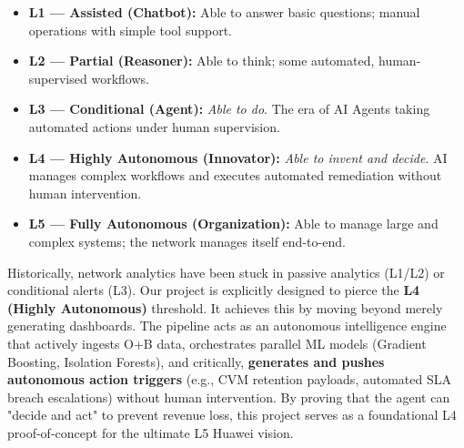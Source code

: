 \begin{itemize}
  \item \textbf{L1 --- Assisted (Chatbot):} Able to answer basic questions; manual operations with simple tool support.
  \item \textbf{L2 --- Partial (Reasoner):} Able to think; some automated, human-supervised workflows.
  \item \textbf{L3 --- Conditional (Agent):} \emph{Able to do}. The era of AI Agents taking automated actions under human supervision.
  \item \textbf{L4 --- Highly Autonomous (Innovator):} \emph{Able to invent and decide}. AI manages complex workflows and executes automated remediation without human intervention.
  \item \textbf{L5 --- Fully Autonomous (Organization):} Able to manage large and complex systems; the network manages itself end-to-end.
\end{itemize}

Historically, network analytics have been stuck in passive analytics (L1/L2) or conditional alerts (L3). Our project is explicitly designed to pierce the \textbf{L4 (Highly Autonomous)} threshold. It achieves this by moving beyond merely generating dashboards. The pipeline acts as an autonomous intelligence engine that actively ingests O+B data, orchestrates parallel ML models (Gradient Boosting, Isolation Forests), and critically, \textbf{generates and pushes autonomous action triggers} (e.g., CVM retention payloads, automated SLA breach escalations) without human intervention. By proving that the agent can "decide and act" to prevent revenue loss, this project serves as a foundational L4 proof-of-concept for the ultimate L5 Huawei vision.

